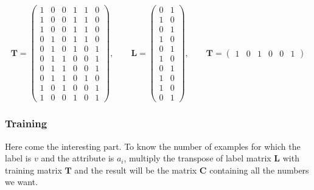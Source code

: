 \documentclass[a4paper]{article}
\newcommand{\matr}[1]{\mathbf{#1}}
\begin{document}
			\begin{equation*}
				\matr{T} =
				\begin{pmatrix}
					1 & 0 & 0 & 1 & 1 & 0 \\
					1 & 0 & 0 & 1 & 1 & 0 \\
					1 & 0 & 0 & 1 & 1 & 0 \\
					0 & 1 & 0 & 1 & 1 & 0 \\
					0 & 1 & 0 & 1 & 0 & 1 \\
					0 & 1 & 1 & 0 & 0 & 1 \\
					0 & 1 & 1 & 0 & 0 & 1 \\
					0 & 1 & 1 & 0 & 1 & 0 \\
					1 & 0 & 1 & 0 & 0 & 1 \\
					1 & 0 & 0 & 1 & 0 & 1
				\end{pmatrix}
				, \qquad 
				\matr{L} =
				\begin{pmatrix}
					0 & 1 \\
					1 & 0 \\
					0 & 1 \\
					1 & 0 \\
					0 & 1 \\
					1 & 0 \\
					0 & 1 \\
					1 & 0 \\
					1 & 0 \\
					0 & 1
				\end{pmatrix}
				, \qquad
				\matr{T} = \begin{pmatrix} 1&0&1&0&0&1 \end{pmatrix}
			\end{equation*}
			
		\subsubsection{Training}

			Here come the interesting part. To know the number of examples for which
			the label is $v$ and the attribute is $a_i$, multiply the transpose of label
			matrix $\matr{L}$ with training matrix $\matr{T}$ and the result will be
			the matrix $\matr{C}$ containing all the numbers we want.
\end{document}
